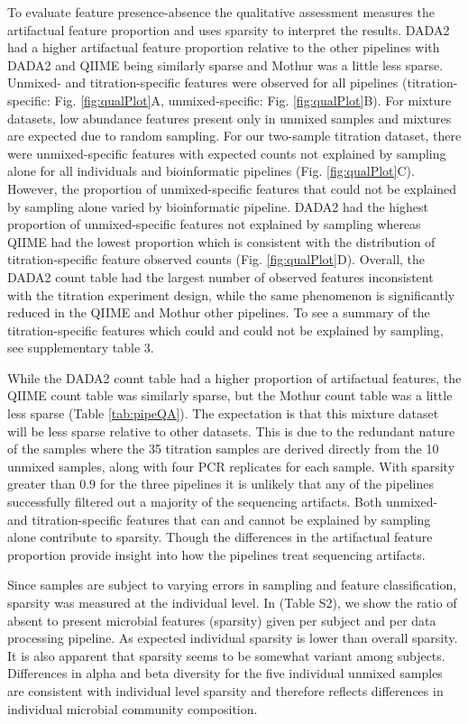 \documentclass{bmcart}
\begin{document}
To evaluate feature presence-absence the qualitative assessment measures
the artifactual feature proportion and uses sparsity to interpret the results.
DADA2 had a higher artifactual feature proportion relative to the other
pipelines with DADA2 and QIIME being similarly sparse and Mothur was a little less sparse.
Unmixed- and titration-specific features were observed for all pipelines
(titration-specific: Fig. \ref{fig:qualPlot}A, unmixed-specific: Fig.
\ref{fig:qualPlot}B).
For mixture datasets, low abundance features
present only in unmixed samples and mixtures are expected due to random
sampling. For our two-sample titration dataset, there were
unmixed-specific features with expected counts not explained by sampling
alone for all individuals and bioinformatic pipelines (Fig.
\ref{fig:qualPlot}C). However, the proportion of unmixed-specific
features that could not be explained by sampling alone varied by
bioinformatic pipeline. DADA2 had the highest proportion of
unmixed-specific features not explained by sampling whereas QIIME had
the lowest proportion which is consistent with the distribution
of titration-specific feature observed counts (Fig. \ref{fig:qualPlot}D).
Overall, the DADA2 count table had the largest
number of observed features inconsistent with the titration experiment
design, while the same phenomenon is significantly reduced in the QIIME and Mothur other pipelines. To see a summary of the titration-specific features which could and could not be explained by sampling, see supplementary table 3.

While the DADA2 count table had a higher proportion of artifactual features, the
QIIME count table was similarly sparse, but the Mothur count table was a little less sparse (Table \ref{tab:pipeQA}).
The expectation is that this mixture dataset will be less sparse relative to other datasets.
This is due to the redundant nature of the samples where the 35 titration samples are derived
directly from the 10 unmixed samples, along with four PCR replicates for
each sample. With sparsity greater than 0.9 for the three pipelines it
is unlikely that any of the pipelines successfully filtered out a
majority of the sequencing artifacts. Both unmixed- and titration-specific
features that can and cannot be explained by sampling alone contribute
to sparsity. Though the differences in the artifactual feature proportion
provide insight into how the pipelines treat sequencing artifacts.

Since samples are subject to varying errors in sampling and feature classification, 
sparsity was measured at the individual level. 
In (Table S2), we show the ratio of absent to present microbial features (sparsity) given per subject and per data processing pipeline. 
As expected individual sparsity is lower than overall sparsity. 
It is also apparent that sparsity seems to be somewhat variant among subjects. 
Differences in alpha and beta diversity for the five individual unmixed samples are consistent with individual level sparsity and therefore reflects differences in individual microbial community composition.
\end{document}
